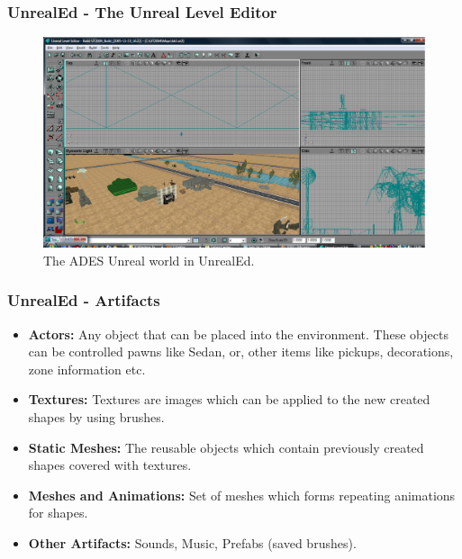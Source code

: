 \documentclass{beamer}
\begin{document}
\begin{frame}
	\frametitle{UnrealEd - The Unreal Level Editor}
	\begin{figure}[ht]
	\begin{center}
	\includegraphics[width=.6\paperwidth]{../img/UnrealEdQuad.eps}
	\caption{The ADES Unreal world in UnrealEd.}
	\label{fig:UnrealEdQuad}
	\end{center}
	\end{figure}
\end{frame}

\begin{frame}
	\frametitle{UnrealEd - Artifacts}
	\begin{itemize}
	    \item \textbf{Actors:} Any object that can be placed into the environment. These objects can be controlled pawns like Sedan, or, other items like pickups, decorations, zone information etc.
	    \item \textbf{Textures:} Textures are images which can be applied to the new created shapes by using brushes.
	    \item \textbf{Static Meshes:} The reusable objects which contain previously created shapes covered with textures.
	    \item \textbf{Meshes and Animations:} Set of meshes which forms repeating animations for shapes.
	    \item \textbf{Other Artifacts:} Sounds, Music, Prefabs (saved brushes).
	\end{itemize}
\end{frame}
\end{document}
